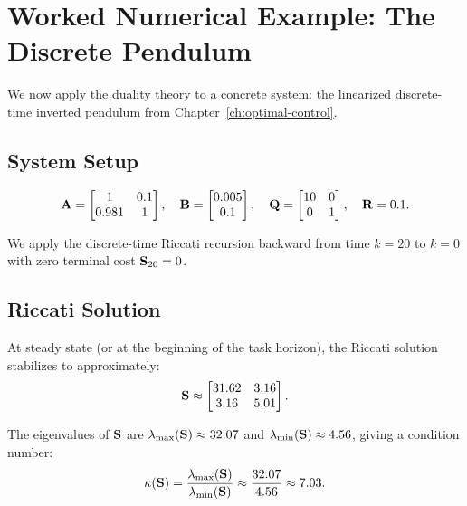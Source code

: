 \section{Worked Numerical Example: The Discrete Pendulum}

We now apply the duality theory to a concrete system: the linearized discrete-time inverted pendulum from
Chapter~\ref{ch:optimal-control}.

\subsection{System Setup}

\begin{equation}
\mathbf{A} = \begin{bmatrix} 1 & 0.1 \\ 0.981 & 1 \end{bmatrix}, \quad
\mathbf{B} = \begin{bmatrix} 0.005 \\ 0.1 \end{bmatrix}, \quad
\mathbf{Q} = \begin{bmatrix} 10 & 0 \\ 0 & 1 \end{bmatrix}, \quad
\mathbf{R} = 0.1.
\label{eq:ch6:example-system}
\end{equation}

We apply the discrete-time Riccati recursion backward from time $k=20$ to $k=0$ with zero terminal cost $\mathbf{S}_{20} = 0$.

\subsection{Riccati Solution}

At steady state (or at the beginning of the task horizon), the Riccati solution stabilizes to approximately:
\begin{equation}
\mathbf{S} \approx \begin{bmatrix} 31.62 & 3.16 \\ 3.16 & 5.01 \end{bmatrix}.
\label{eq:ch6:riccati-solution}
\end{equation}

The eigenvalues of $\mathbf{S}$ are $\lambda_{\max}(\mathbf{S}) \approx 32.07$ and $\lambda_{\min}(\mathbf{S}) \approx 4.56$, giving a
condition number:
\begin{equation}
\kappa(\mathbf{S}) = \frac{\lambda_{\max}(\mathbf{S})}{\lambda_{\min}(\mathbf{S})} \approx \frac{32.07}{4.56} \approx 7.03.
\label{eq:ch6:condition-number}
\end{equation}

